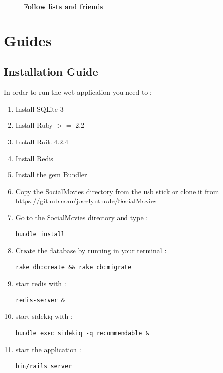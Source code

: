 \documentclass[12pt,a4paper]{article}
\begin{document}
\begin{figure}[h]
\begin{center}
\end{center}
\caption{\textbf{Follow lists and friends}}
\label{myfriends_follow}
\end{figure}

\section{Guides}\label{install}

\subsection{Installation Guide}
In order to run the web application you need to :
\begin{enumerate}
\item Install SQLite 3
\item Install Ruby $>=$ 2.2
\item Install Rails 4.2.4
\item Install Redis
\item Install the gem Bundler
\item Copy the SocialMovies directory from the usb stick or clone it from \href{https://github.com/jocelynthode/SocialMovies}{https://github.com/jocelynthode/SocialMovies}
\item Go to the SocialMovies directory and type : \begin{lstlisting} 
bundle install 
\end{lstlisting}
\item Create the database by running in your terminal :
\begin{lstlisting} 
rake db:create && rake db:migrate
\end{lstlisting}
\item start redis with :
\begin{lstlisting} 
redis-server &
\end{lstlisting}
\item start sidekiq with :
\begin{lstlisting} 
bundle exec sidekiq -q recommendable &
\end{lstlisting}
\item start the application :
\begin{lstlisting} 
bin/rails server
\end{lstlisting}
\end{enumerate}
\end{document}
